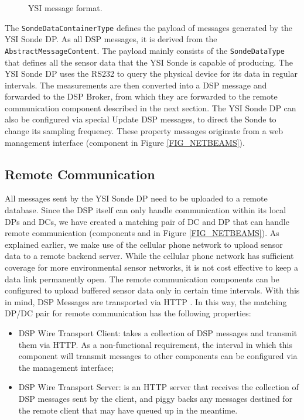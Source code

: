 \documentclass[conference]{IEEEtran}
\begin{document}
\begin{figure}[!htb]
\centering
{}
\caption{\label{FIG_DSP_YSI_DATA} YSI message format.}
\end{figure}

The \texttt{SondeDataContainerType} defines the payload of messages generated
by the YSI Sonde DP. As all DSP messages, it is derived from the
\texttt{AbstractMessageContent}. The payload mainly consists of the
\texttt{SondeDataType} that defines all the sensor data that the YSI Sonde is
capable of producing. The YSI Sonde DP uses the RS232 to query the
physical device for its data in regular intervals. The measurements
are then converted into a DSP message and forwarded to the DSP Broker,
from which they are forwarded to the remote communication component
described in the next section.  The YSI Sonde DP can also be
configured via special Update DSP messages, to direct the Sonde to change its
sampling frequency.  These property messages originate from a web
management interface (component  in Figure \ref{FIG_NETBEAMS}).


\subsection{Remote Communication}

All messages sent by the YSI Sonde DP need to be uploaded to a remote
database. Since the DSP itself can only handle communication within
its local DPs and DCs, we have created a matching pair of DC and DP
that can handle remote communication (components  and  in Figure
\ref{FIG_NETBEAMS}). As explained earlier, we make use of the cellular
phone network to upload sensor data to a remote backend server. While
the cellular phone network has sufficient coverage for more
environmental sensor networks, it is not cost effective to keep a data
link permanently open. The remote communication components can be
configured to upload buffered sensor data only in certain time
intervals. With this in mind, DSP Messages are transported via HTTP
\cite{RFC2068}. In this way, the matching DP/DC pair for remote communication
has the following properties:

\begin{itemize}
\item DSP Wire Transport Client: takes a collection of DSP messages
  and transmit them via HTTP. As a non-functional requirement, the
  interval in which this component will transmit messages to other
  components can be configured via the management interface;
\item DSP Wire Transport Server: is an HTTP server that receives the
  collection of DSP messages sent by the client, and piggy backs any
  messages destined for the remote client that may have queued up in
  the meantime.
\end{itemize}
\end{document}

